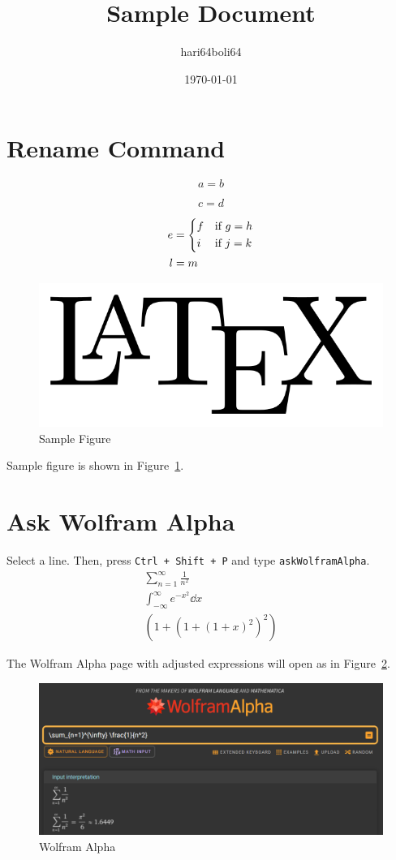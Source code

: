 \documentclass[a4paper, 10pt]{article}
\begin{document}
\title{Sample Document}
\author{hari64boli64}
\date{\today}
\maketitle

\section{Rename Command}

\begin{equation}\label{eq:1}
    a = b
\end{equation}

\begin{equation*}
    c = d
\end{equation*}

\begin{align}
    e & = \begin{dcases}
              f & \text{if } g = h \\
              i & \text{if } j = k
          \end{dcases} \\
    l & = m \notag
\end{align}

\begin{figure}[h] %
    \centering
    \includegraphics[width=0.5\columnwidth]{../images/sample.png}
    \caption{Sample Figure}
    \label{fig:1}
\end{figure}

Sample figure is shown in Figure~\ref{fig:1}.

\section{Ask Wolfram Alpha}

Select a line. Then, press \texttt{Ctrl + Shift + P} and type \texttt{askWolframAlpha}.
\begin{gather*}
    \sum_{n=1}^{\infty} \frac{1}{n^2} \\
    \int_{-\infty}^{\infty} e^{-x^2} \dd x \\
    \left(1+\left(1+\left(1+x\right)^2\right)^2\right)
\end{gather*}

The Wolfram Alpha page with adjusted expressions will open as in Figure~\ref{fig:2}.
\begin{figure}[htbp]
    \centering
    \includegraphics[width=\columnwidth]{../images/WolframAlpha.png}
    \caption{Wolfram Alpha}
    \label{fig:2}
\end{figure}
\end{document}
